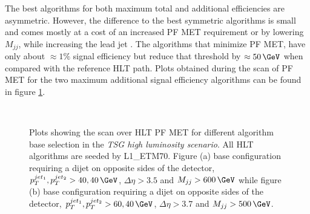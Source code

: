 The best algorithms for both maximum total and additional efficiencies are asymmetric. However, the difference to the best symmetric algorithms is small and comes mostly at a cost of an increased \gls{PF} \gls{MET} requirement or by lowering $M_{jj}$, while increasing the lead jet \pt. The algorithms that minimize \gls{PF} \gls{MET}, have only about $\approx 1\%$ signal efficiency but reduce that threshold by $\approx 50\,\GeV$ when compared with the reference \gls{HLT} path. Plots obtained during the scan of \gls{PF} \gls{MET} for the two maximum additional signal efficiency algorithms can be found in figure \ref{FIGURE:RunIIPreparation_HLT_Seed_L1TETM70}.

\begin{figure}[!htp]
\centering
{}\qquad
{}\\
\caption{Plots showing the scan over \gls{HLT} \gls{PF} \gls{MET} for different algorithm base selection in the \textit{\gls{TSG} high luminosity scenario}. All \gls{HLT} algorithms are seeded by L1\_ETM70. Figure (a) base configuration requiring a dijet on opposite sides of the detector, $p_T^{jet_1},p_T^{jet_2}>40,40\,\GeV$, $\Delta\eta>3.5$ and $M_{jj}>600\,\GeV$ while figure (b) base configuration requiring a dijet on opposite sides of the detector, $p_T^{jet_1},p_T^{jet_2}>60,40\,\GeV$, $\Delta\eta>3.7$ and $M_{jj}>500\,\GeV$.}
\label{FIGURE:RunIIPreparation_HLT_Seed_L1TETM70}
\end{figure}

